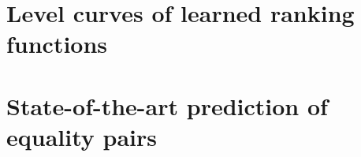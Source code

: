\documentclass{article}
\begin{document}
\section*{Level curves of learned ranking functions}




\section*{State-of-the-art prediction of equality pairs}




\end{document}
